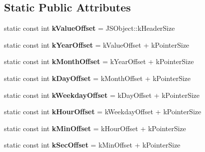 \subsection*{Static Public Attributes}
\begin{DoxyCompactItemize}
\item 
\hypertarget{classv8_1_1internal_1_1_j_s_date_a42f62e74380a2fde764c5efe7605e0c7}{}static const int {\bfseries k\+Value\+Offset} = J\+S\+Object\+::k\+Header\+Size\label{classv8_1_1internal_1_1_j_s_date_a42f62e74380a2fde764c5efe7605e0c7}

\item 
\hypertarget{classv8_1_1internal_1_1_j_s_date_ac70d435cc4b8043aea093053d814b711}{}static const int {\bfseries k\+Year\+Offset} = k\+Value\+Offset + k\+Pointer\+Size\label{classv8_1_1internal_1_1_j_s_date_ac70d435cc4b8043aea093053d814b711}

\item 
\hypertarget{classv8_1_1internal_1_1_j_s_date_a871a1beff8b50dde5806d2c0c6d99a51}{}static const int {\bfseries k\+Month\+Offset} = k\+Year\+Offset + k\+Pointer\+Size\label{classv8_1_1internal_1_1_j_s_date_a871a1beff8b50dde5806d2c0c6d99a51}

\item 
\hypertarget{classv8_1_1internal_1_1_j_s_date_a18c495bfb324c1fc0291bcaa90dd4955}{}static const int {\bfseries k\+Day\+Offset} = k\+Month\+Offset + k\+Pointer\+Size\label{classv8_1_1internal_1_1_j_s_date_a18c495bfb324c1fc0291bcaa90dd4955}

\item 
\hypertarget{classv8_1_1internal_1_1_j_s_date_a524c26a7e64b392e0867f4a8765ad569}{}static const int {\bfseries k\+Weekday\+Offset} = k\+Day\+Offset + k\+Pointer\+Size\label{classv8_1_1internal_1_1_j_s_date_a524c26a7e64b392e0867f4a8765ad569}

\item 
\hypertarget{classv8_1_1internal_1_1_j_s_date_ae21c9b039f413f20a28fabc87d7fdb7f}{}static const int {\bfseries k\+Hour\+Offset} = k\+Weekday\+Offset + k\+Pointer\+Size\label{classv8_1_1internal_1_1_j_s_date_ae21c9b039f413f20a28fabc87d7fdb7f}

\item 
\hypertarget{classv8_1_1internal_1_1_j_s_date_a3f1f64a3808e921e2a4b1c550f24861b}{}static const int {\bfseries k\+Min\+Offset} = k\+Hour\+Offset + k\+Pointer\+Size\label{classv8_1_1internal_1_1_j_s_date_a3f1f64a3808e921e2a4b1c550f24861b}

\item 
\hypertarget{classv8_1_1internal_1_1_j_s_date_ad65d0f71fce7a37d4195b695b27152fc}{}static const int {\bfseries k\+Sec\+Offset} = k\+Min\+Offset + k\+Pointer\+Size\label{classv8_1_1internal_1_1_j_s_date_ad65d0f71fce7a37d4195b695b27152fc}


\end{DoxyCompactItemize}
